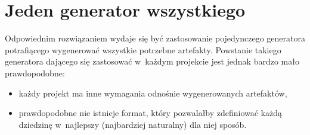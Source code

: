 \section{Jeden generator wszystkiego}

Odpowiednim rozwiązaniem wydaje się być zastosowanie pojedynczego generatora potrafiącego wygenerować wszystkie potrzebne artefakty.
Powstanie takiego generatora dającego się zastosować w~każdym projekcie jest jednak bardzo mało prawdopodobne:

\begin{itemize}
 \item każdy projekt ma inne wymagania odnośnie wygenerowanych artefaktów,
 \item prawdopodobne nie istnieje format, który pozwalałby zdefiniować każdą dziedzinę w~najlepszy (najbardziej naturalny) dla niej sposób.
\end{itemize}
